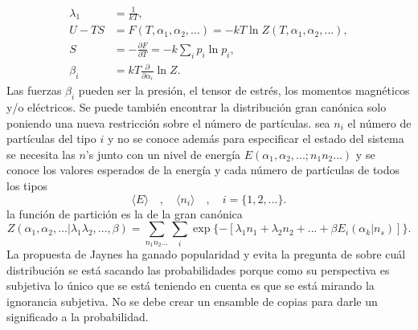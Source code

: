 \begin{align*}
\lambda_{1} &=\frac{1}{kT}, \\
U-TS &= F(T,\alpha_{1},\alpha_{2},...)=-kT \ln Z(T,\alpha_{1},\alpha_{2},...), \\
S &= -\frac{\partial F}{\partial T}=-k\sum_{i} p_{i} \ln p_{i}, \\
\beta_{i} &= kT \frac{\partial }{\partial \alpha_{i}} \ln Z.
\end{align*}
Las fuerzas $\beta_{i}$ pueden ser la presión, el tensor de estrés, los momentos magnéticos y/o  eléctricos. Se puede también encontrar la distribución gran canónica solo poniendo una nueva restricción sobre el número de partículas. sea $n_{i}$ el número de partículas del tipo $i$ y no se conoce además para especificar el estado del sistema se necesita las $n$'s junto con un nivel de energía $E(\alpha_{1},\alpha_{2},...;n_{1}n_{2}...)$ y se conoce los valores esperados de la energía y cada número de partículas de todos los tipos
\begin{equation}
\langle E \rangle \quad , \quad \langle n_{i} \rangle \quad , \quad i=  \{ 1,2,... \}.
\end{equation} 
la función de partición es la de la gran canónica 
\begin{equation}
Z(\alpha_{1},\alpha_{2},...|\lambda_{1} \lambda_{2} ,...,\beta )= \sum_{n_{1} n_{2}...} \sum_{i} \exp \{ -[ \lambda_{1} n_{1}+\lambda_{2} n_{2}+...+\beta E_{i} (\alpha_{k} | n_{s} ) ] \}.
\end{equation}
La propuesta de Jaynes ha ganado popularidad y evita la pregunta de sobre cuál distribución se está sacando las probabilidades porque como su perspectiva es subjetiva lo único que se está teniendo en cuenta es que se está mirando la ignorancia subjetiva. No se debe crear un ensamble de copias para darle un significado a la probabilidad.

